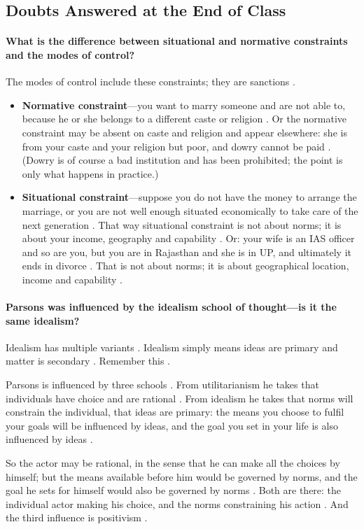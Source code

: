\subsection{Doubts Answered at the End of Class}
\paragraph{What is the difference between situational and normative constraints and the modes of control?}
The modes of control include these constraints; they are sanctions .
\begin{itemize}
    \item \textbf{Normative constraint}---you want to marry someone and are not able to, because he or she belongs to a different caste or religion . Or the normative constraint may be absent on caste and religion and appear elsewhere: she is from your caste and your religion but poor, and dowry cannot be paid . (Dowry is of course a bad institution and has been prohibited; the point is only what happens in practice.) 
    \item \textbf{Situational constraint}---suppose you do not have the money to arrange the marriage, or you are not well enough situated economically to take care of the next generation . That way situational constraint is not about norms; it is about your income, geography and capability . Or: your wife is an IAS officer and so are you, but you are in Rajasthan and she is in UP, and ultimately it ends in divorce . That is not about norms; it is about geographical location, income and capability .
\end{itemize}

\paragraph{Parsons was influenced by the idealism school of thought---is it the same idealism?}
Idealism has multiple variants . Idealism simply means ideas are primary and matter is secondary . Remember this .

Parsons is influenced by three schools . From utilitarianism he takes that individuals have choice and are rational . From idealism he takes that norms will constrain the individual, that ideas are primary: the means you choose to fulfil your goals will be influenced by ideas, and the goal you set in your life is also influenced by ideas .

So the actor may be rational, in the sense that he can make all the choices by himself; but the means available before him would be governed by norms, and the goal he sets for himself would also be governed by norms . Both are there: the individual actor making his choice, and the norms constraining his action . And the third influence is positivism .

